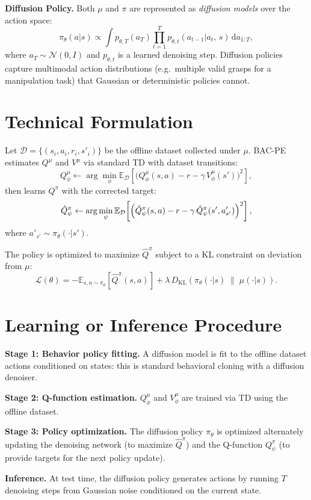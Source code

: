 \documentclass[10pt,twocolumn]{article}
\begin{document}
\textbf{Diffusion Policy.}
Both $\mu$ and $\pi$ are represented as \emph{diffusion models} over the action space:
\[
\pi_\theta(a|s) \propto \int p_{\theta,T}(a_T)\prod_{t=1}^T
p_{\theta,t}(a_{t-1}|a_t,\,s)\,\mathrm{d}a_{1:T},
\]
where $a_T \sim \mathcal{N}(0, I)$ and $p_{\theta,t}$ is a learned denoising step.
Diffusion policies capture multimodal action distributions (e.g.\ multiple valid
grasps for a manipulation task) that Gaussian or deterministic policies cannot.

\section{Technical Formulation}

Let $\mathcal{D} = \{(s_i, a_i, r_i, s'_i)\}$ be the offline dataset collected under
$\mu$. BAC-PE estimates $Q^\mu$ and $V^\mu$ via standard TD with dataset transitions:
\[
Q^\mu_{\phi} \leftarrow \arg\min_\phi \mathbb{E}_{\mathcal{D}}\!\left[
  \bigl(Q^\mu_\phi(s,a) - r - \gamma\,V^\mu_\phi(s')\bigr)^2\right],
\]
then learns $Q^\pi$ with the corrected target:
\[
\hat{Q}^\pi_\psi \leftarrow \arg\min_\psi \mathbb{E}_{\mathcal{D}}\!\left[
  \Bigl(\hat{Q}^\pi_\psi(s,a) - r - \gamma\,\hat{Q}^\pi_\psi(s', a'_{s'})\Bigr)^2
  \right],
\]
where $a'_{s'} \sim \pi_\theta(\cdot|s')$.

The policy is optimized to maximize $\hat{Q}^\pi$ subject to a KL constraint on
deviation from $\mu$:
\[
\mathcal{L}(\theta) = -\mathbb{E}_{s, a \sim \pi_\theta}\!\left[\hat{Q}^\pi(s,a)\right]
+ \lambda\,D_{\mathrm{KL}}(\pi_\theta(\cdot|s)\;\|\;\mu(\cdot|s)).
\]

\section{Learning or Inference Procedure}

\textbf{Stage 1: Behavior policy fitting.} A diffusion model is fit to the offline
dataset actions conditioned on states: this is standard behavioral cloning with a
diffusion denoiser.

\textbf{Stage 2: Q-function estimation.} $Q^\mu_\phi$ and $V^\mu_\phi$ are trained
via TD using the offline dataset.

\textbf{Stage 3: Policy optimization.} The diffusion policy $\pi_\theta$ is optimized
alternately updating the denoising network (to maximize $\hat{Q}^\pi$) and the
Q-function $Q^\pi_\psi$ (to provide targets for the next policy update).

\textbf{Inference.} At test time, the diffusion policy generates actions by running $T$
denoising steps from Gaussian noise conditioned on the current state.
\end{document}
